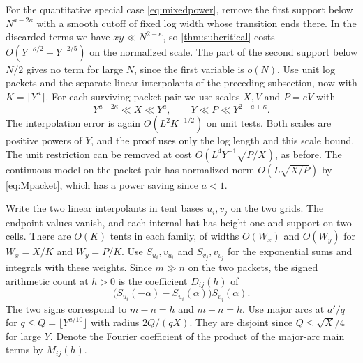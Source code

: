 \documentclass[11pt,a4paper]{article}
\numberwithin{equation}{section}
\begin{document}
For the quantitative special case \eqref{eq:mixedpower},
remove the first support below
$N^{a-2\kappa}$ with a smooth cutoff of fixed log width
whose transition ends there. In the discarded terms we have
$xy\ll N^{2-\kappa}$, so \cref{thm:subcritical} costs
$O(Y^{-\kappa/2}+Y^{-2/5})$ on the normalized scale.
The part of the second support below $N/2$ gives no term
for large $N$, since the first variable is $o(N)$.
Use unit log packets and the separate linear interpolants
of the preceding subsection, now with
$K=\lceil Y^\kappa\rceil$. For each surviving packet pair
we use scales $X,V$ and $P=eV$ with
\begin{equation}
 Y^{a-2\kappa}\ll X\ll Y^a,\qquad
 Y\ll P\ll Y^{2-a+\kappa}.
 \label{eq:mixedscales}
\end{equation}
The interpolation error is again $O(L^2 K^{-1/2})$ on
unit tests. Both scales are positive powers of $Y$, and
the proof uses only the log length and this scale bound.
The unit restriction can be removed at cost
$O(L^4Y^{-1}\sqrt{P/X})$, as before.
The continuous model on the packet pair has normalized
norm $O(L\sqrt{X/P})$ by \cref{eq:Mpacket}, which has a
power saving since $a<1$.

Write the two linear interpolants in tent bases
$u_i,v_j$ on the two grids. The endpoint values vanish,
and each internal hat has height one and support on two
cells. There are $O(K)$ tents in each family, of widths
$O(W_x)$ and $O(W_y)$ for $W_x=X/K$ and $W_y=P/K$.
Use $S_{u_i},v_{u_i}$ and $S_{v_j},v_{v_j}$ for the
exponential sums and integrals with these weights. Since
$m\gg n$ on the two packets, the signed arithmetic count
at $h>0$ is the coefficient $D_{ij}(h)$ of
\[
       \bigl(S_{u_i}(-\alpha)-S_{u_i}(\alpha)\bigr)S_{v_j}(\alpha).
\]
The two signs correspond to $m-n=h$ and $m+n=h$.
Use major arcs at $a'/q$ for $q\le Q=\lfloor Y^{a/10}\rfloor$
with radius $2Q/(qX)$. They are disjoint since
$Q\le\sqrt X/4$ for large $Y$. Denote the Fourier coefficient
of the product of the major-arc main terms by $M_{ij}(h)$.
\end{document}
